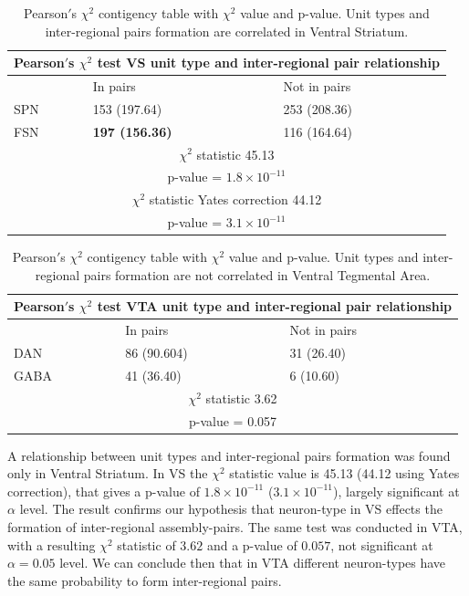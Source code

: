 \begin{table}[H]
\begin{tabular}{ |p{3cm}|p{3cm}|p{3cm}| }
 \hline
 \multicolumn{3}{|c|}{Pearson$'$s $\chi^2$ test VS unit type and inter-regional pair relationship} \\
 \hline
 & In pairs & Not in pairs\\
 \hline
 SPN & 153 (197.64) & 253 (208.36) \\
 \hline
 FSN & \textbf{197 (156.36)} & 116 (164.64)\\
 \hline
 \multicolumn{3}{|c|}{$\chi^2$ statistic  45.13}\\
 \multicolumn{3}{|c|}{p-value = $1.8\times10^{-11}$}\\
 \hline
 \multicolumn{3}{|c|}{$\chi^2$ statistic Yates correction 44.12}\\
 \multicolumn{3}{|c|}{p-value = $3.1\times10^{-11}$}\\
 \hline
\end{tabular}
\caption{Pearson$'$s $\chi^2$ contigency table with $\chi^2$ value and p-value. Unit types and inter-regional pairs formation are correlated in Ventral Striatum.}
\label{tab:chi2_asnotasVS}
\end{table}
\begin{table}[H]
\begin{tabular}{ |p{3cm}|p{3cm}|p{3cm}| }
 \hline
 \multicolumn{3}{|c|}{Pearson$'$s $\chi^2$ test VTA unit type and inter-regional pair relationship} \\
 \hline
 & In pairs & Not in pairs\\
 \hline
 DAN & 86 (90.604) & 31 (26.40) \\
 \hline
 GABA & 41 (36.40) & 6 (10.60)\\
 \hline
 \multicolumn{3}{|c|}{$\chi^2$ statistic  3.62}\\
 \multicolumn{3}{|c|}{p-value = 0.057}\\
 \hline
\end{tabular}
\caption{Pearson$'$s $\chi^2$ contigency table with $\chi^2$ value and p-value. Unit types and inter-regional pairs formation are not correlated in Ventral Tegmental Area.}
\label{tab:chi2_asnotasVTA}
\end{table}
A relationship between unit types and inter-regional pairs formation was found only in Ventral Striatum. In VS the $\chi^2$ statistic value is 45.13 (44.12 using Yates correction), that gives a p-value of $1.8\times10^{-11}$ ($3.1\times10^{-11}$), largely significant at $\alpha$ level. The result confirms our hypothesis that neuron-type in VS effects the formation of inter-regional assembly-pairs. The same test was conducted in VTA, with a resulting $\chi^2$ statistic of $3.62$ and a p-value of $0.057$, not significant at $\alpha = 0.05$ level. We can conclude then that in VTA different neuron-types have the same probability to form inter-regional pairs.
